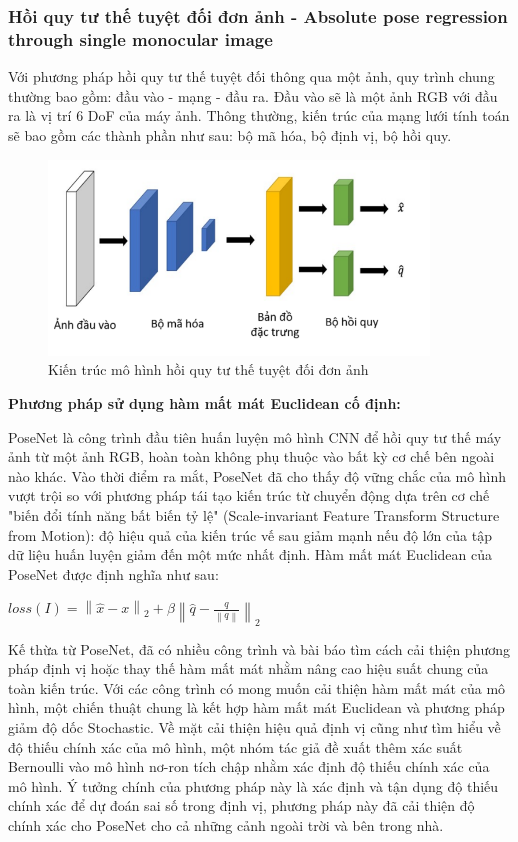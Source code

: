 \subsubsection*{Hồi quy tư thế tuyệt đối đơn ảnh - Absolute pose regression through single monocular image}
Với phương pháp hồi quy tư thế tuyệt đối thông qua một ảnh, quy trình chung thường bao gồm: đầu vào - mạng - đầu ra. Đầu vào sẽ là một ảnh RGB với đầu ra là vị trí 6 DoF của máy ảnh. Thông thường, kiến trúc của mạng lưới tính toán sẽ bao gồm các thành phần như sau: bộ mã hóa, bộ định vị, bộ hồi quy.

\begin{figure}[H]
    \centering
    \includegraphics[width=0.9\textwidth]{pics/Chapter2/kientruc_APR_1.png}
    \caption{Kiến trúc mô hình hồi quy tư thế tuyệt đối đơn ảnh \cite{kendall2016posenet}}
\end{figure}

\noindent\textbf{Phương pháp sử dụng hàm mất mát Euclidean cố định:}

PoseNet \cite{kendall2016posenet} là công trình đầu tiên huấn luyện mô hình CNN để hồi quy tư thế máy ảnh từ một ảnh RGB, hoàn toàn không phụ thuộc vào bất kỳ cơ chế bên ngoài nào khác. Vào thời điểm ra mắt, PoseNet đã cho thấy độ vững chắc của mô hình vượt trội so với phương pháp tái tạo kiến trúc từ chuyển động dựa trên cơ chế "biến đổi tính năng bất biến tỷ lệ" (Scale-invariant Feature Transform Structure from Motion): độ hiệu quả của kiến trúc vế sau giảm mạnh nếu độ lớn của tập dữ liệu huấn luyện giảm đến một mức nhất định. Hàm mất mát Euclidean của PoseNet được định nghĩa như sau:
\begin{center}
    $loss(I) = \left \| \hat{x} - x \right \|_2 + \beta \left \| \hat{q} - \frac{q}{\left \| q \right \|} \right \|_2$
\end{center}

Kế thừa từ PoseNet, đã có nhiều công trình và bài báo tìm cách cải thiện phương pháp định vị hoặc thay thế hàm mất mát nhằm nâng cao hiệu suất chung của toàn kiến trúc. Với các công trình có mong muốn cải thiện hàm mất mát của mô hình, một chiến thuật chung là kết hợp hàm mất mát Euclidean và phương pháp giảm độ dốc Stochastic. Về mặt cải thiện hiệu quả định vị cũng như tìm hiểu về độ thiếu chính xác của mô hình, một nhóm tác giả đề xuất thêm xác suất Bernoulli vào mô hình nơ-ron tích chập \cite{kendall2016modelling} nhằm xác định độ thiếu chính xác của mô hình. Ý tưởng chính của phương pháp này là xác định và tận dụng độ thiếu chính xác để dự đoán sai số trong định vị, phương pháp này đã cải thiện độ chính xác cho PoseNet cho cả những cảnh ngoài trời và bên trong nhà.

